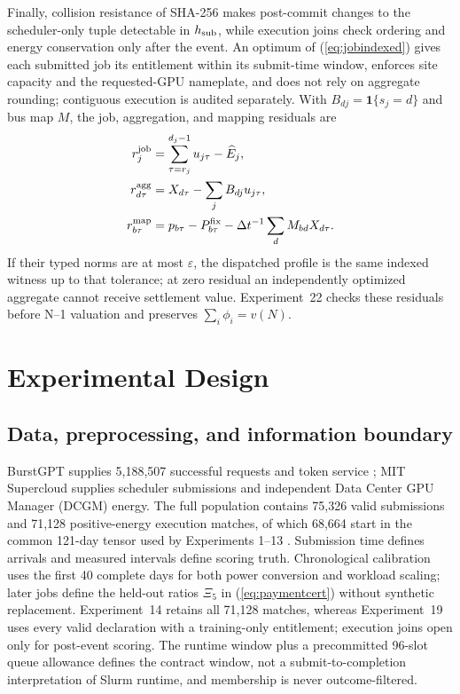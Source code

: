 \documentclass[10pt,journal]{IEEEtran}
\newcommand{\dt}{\Delta t}
\begin{document}
Finally, collision resistance of SHA-256 makes post-commit changes to the
scheduler-only tuple detectable in $h_{\rm sub}$, while execution joins check
ordering and energy conservation only after the event. An optimum of (\ref{eq:jobindexed}) gives each submitted job its entitlement within its
submit-time window, enforces site capacity and the requested-GPU nameplate, and
does not rely on aggregate rounding; contiguous execution is audited separately.
With $B_{dj}=\mathbf1\{s_j=d\}$ and bus map $M$, the job, aggregation, and
mapping residuals are
\begin{align*}
r^{\rm job}_j&=\sum_{\tau=r_j}^{d_j-1}u_{j\tau}-\widehat E_j,\\
r^{\rm agg}_{d\tau}&=X_{d\tau}-\sum_jB_{dj}u_{j\tau},\\
r^{\rm map}_{b\tau}&=p_{b\tau}-P^{\rm fix}_{b\tau}-\dt^{-1}\sum_dM_{bd}X_{d\tau}.
\end{align*}
If their typed norms are at most $\varepsilon$, the dispatched profile is the
same indexed witness up to that tolerance; at zero residual an independently
optimized aggregate cannot receive settlement value. Experiment~22 checks
these residuals before N--1 valuation and preserves $\sum_i\phi_i=v(N)$.

\section{Experimental Design}\label{sec:design}

\subsection{Data, preprocessing, and information boundary}

BurstGPT supplies 5,188,507 successful requests and token service
\cite{wang2024burstgpt}; MIT Supercloud supplies scheduler submissions and
independent Data Center GPU Manager (DCGM) energy. The full population contains
75,326 valid submissions and 71,128 positive-energy execution matches, of which
68,664 start in the common 121-day tensor used by Experiments 1--13
\cite{samsi2021supercloud}. Submission time defines arrivals and measured
intervals define scoring truth. Chronological calibration uses the first 40
complete days for both power conversion and workload scaling; later jobs define
the held-out ratios $\Xi_5$ in (\ref{eq:paymentcert}) without synthetic
replacement. Experiment~14 retains all 71,128 matches, whereas Experiment~19
uses every valid declaration with a training-only entitlement; execution joins
open only for post-event scoring. The runtime window plus a precommitted
96-slot queue allowance defines the contract window, not a
submit-to-completion interpretation of Slurm runtime, and membership is never
outcome-filtered.
\end{document}
